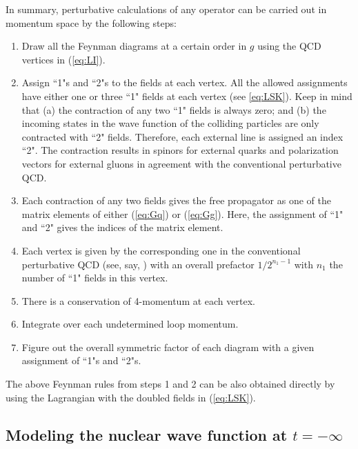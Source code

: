\documentclass[onecolumn,showpacs,nobibnotes,nofootinbib,12pt,aps,prd,showpacs,notitlepage,nofootinbib,preprintnumbers,amsmath,amssymb]{article}
\begin{document}
In summary, perturbative calculations of any operator can be carried
out in momentum space by the following steps:
\begin{enumerate}
\item Draw all the Feynman diagrams at a certain order in $g$ using
  the QCD vertices in (\ref{eq:LI}).

\item Assign ``1"s and ``2"s to the fields at each vertex. All the
  allowed assignments have either one or three ``1" fields at each
  vertex (see \eqref{eq:LSK}). Keep in mind that (a) the contraction
  of any two ``1" fields is always zero; and (b) the incoming states
  in the wave function of the colliding particles are only contracted
  with ``2" fields. Therefore, each external line is assigned an index
  ``2". The contraction results in spinors for external quarks and
  polarization vectors for external gluons in agreement with the
  conventional perturbative QCD.

\item Each contraction of any two fields gives the free propagator as
  one of the matrix elements of either (\ref{eq:Gq}) or
  (\ref{eq:Gg}). Here, the assignment of ``1" and ``2" gives the
  indices of the matrix element.

\item Each vertex is given by the corresponding one in the
  conventional perturbative QCD (see, say, \cite{KovchegovLevin}) with
  an overall prefactor $1/2^{n_1-1}$ with $n_1$ the number of ``1"
  fields in this vertex.

\item There is a conservation of 4-momentum at each vertex.

\item Integrate over each undetermined loop momentum.

\item Figure out the overall symmetric factor of each diagram with a
  given assignment of ``1"s and ``2"s.

\end{enumerate}

The above Feynman rules from steps 1 and 2 can be also obtained
directly by using the Lagrangian with the doubled fields in
(\ref{eq:LSK}).



\subsection{Modeling the nuclear wave function at $t=-\infty$}
\label{eq:DMinit2}
\end{document}
